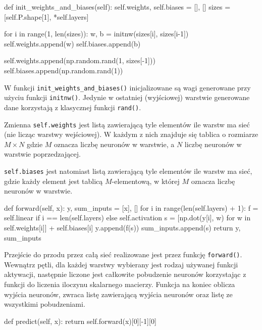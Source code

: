 \documentclass[a4paper,12pt]{article}
\numberwithin{equation}{section}
\begin{document}
\begin{pythoncode}
def init_weights_and_biases(self):
    self.weights, self.biases = [], []
    sizes = [self.P.shape[1], *self.layers]

    for i in range(1, len(sizes)):
        w, b = initnw(sizes[i], sizes[i-1])
        self.weights.append(w)
        self.biases.append(b)

    self.weights.append(np.random.rand(1, sizes[-1]))
    self.biases.append(np.random.rand(1))
\end{pythoncode}

\noindent W funkcji \texttt{init_weights_and_biases()} inicjalizowane są wagi generowane przy użyciu funkcji \texttt{initnw()}. Jedynie w ostatniej (wyjściowej) warstwie generowane dane korzystają z klasycznej funkcji \texttt{rand()}.

\noindent Zmienna \texttt{self.weights} jest listą zawierającą tyle elementów ile warstw ma sieć (nie licząc warstwy wejściowej). W każdym z nich znajduje się tablica o rozmiarze $M \times N$ gdzie $M$ oznacza liczbę neuronów w warstwie, a $N$ liczbę neuronów w warstwie poprzedzającej.

\noindent \texttt{self.biases} jest natomiast listą zawierającą tyle elementów ile warstw ma sieć, gdzie każdy element jest tablicą $M$-elementową, w której $M$ oznacza liczbę neuronów w warstwie.


\begin{pythoncode}
def forward(self, x):
    y, sum_inputs = [x], []
    for i in range(len(self.layers) + 1):
        f = self.linear if i == len(self.layers) else self.activation
        s = [np.dot(y[i], w) for w in self.weights[i]] + self.biases[i]
        y.append(f(s))
        sum_inputs.append(s)
    return y, sum_inputs
\end{pythoncode}

\noindent Przejście do przodu przez całą sieć realizowane jest przez funkcję \texttt{forward()}. Wewnątrz pętli, dla każdej warstwy wybierany jest rodzaj używanej funkcji aktywacji, następnie liczone jest całkowite pobudzenie neuronów korzystając z funkcji do liczenia iloczynu skalarnego macierzy. Funkcja na koniec oblicza wyjścia neuronów, zwraca listę zawierającą wyjścia neuronów oraz listę ze wszystkimi pobudzeniami.


\begin{pythoncode}
def predict(self, x):
    return self.forward(x)[0][-1][0]
\end{pythoncode}
\end{document}
